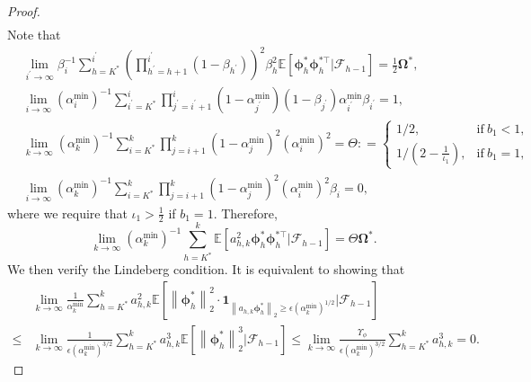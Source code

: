 \documentclass[aos]{imsart}
\numberwithin{equation}{section}
\theoremstyle{plain}
\begin{document}
\begin{appendix}
\begin{proof}
\begin{equation*}
\begin{split}
        \end{split}
    \end{equation*}
    Note that 
    \begin{equation}
        \begin{split}
            & \lim_{i^{\prime} \to \infty} \beta_{i}^{-1} \sum_{h=K^{*}}^{i^{\prime}} \left( \prod_{h^{\prime}=h+1}^{i^{\prime}} (1-\beta_{h^{\prime}}) \right)^2 \beta_h^2 \mathbb{E}\left[\bm{\phi}^{*}_{h}\bm{\phi}^{*\top}_{h}| \mathcal{F}_{h-1} \right] = \frac{1}{2} \bm{\Omega}^{*},\\
            & \lim_{i \to \infty}  (\alpha^{\min}_{i})^{-1} \sum_{i^{\prime}=K^{*}}^{i} \prod_{j^{\prime}=i^{\prime}+1}^{i} \left(1-\alpha^{\min}_{j^{\prime}} \right) \left(1-\beta_{j^{\prime}} \right) \alpha^{\min}_{i^{\prime}} \beta_{i^{\prime}} =  1,\\
            &  \lim_{k \to \infty}  (\alpha^{\min}_{k})^{-1} \sum_{i=K^{*}}^{k} \prod_{j=i+1}^{k} \left(1-\alpha^{\min}_j \right)^2 (\alpha^{\min}_i)^2 = \Theta : = \left\{ \begin{array}{cc}
               1/2,  & \text{if}~b_1 < 1, \\
               1/\left(2 - \frac{1}{\iota_1}\right),  & \text{if}~b_1 = 1,
            \end{array} \right.\\
            & \lim_{i \to \infty}  (\alpha^{\min}_{k})^{-1}  \sum_{i=K^{*}}^{k} \prod_{j=i+1}^{k} (1-\alpha^{\min}_j)^2 (\alpha^{\min}_i)^2 \beta_{i} = 0,
        \end{split}
    \end{equation}
    where we require that $\iota_1 > \frac{1}{2}$ if $b_1 = 1$.
    Therefore, 
    \begin{equation*}
        \lim_{k \to \infty} (\alpha^{\min}_{k})^{-1}   \sum_{h=K^{*}}^{k} \mathbb{E} \left[ a_{h,k}^2  \bm{\phi}^{*}_{h}\bm{\phi}^{*\top}_{h} | \mathcal{F}_{h-1}\right] = \Theta \bm{\Omega}^{*}.
    \end{equation*}
    We then verify the Lindeberg condition. It is equivalent to showing that 
    \begin{equation}
        \begin{split}
            & \lim_{k \to \infty} \frac{1}{\alpha^{\min}_k } \sum_{h=K^{*}}^{k} a_{h,k}^2 \mathbb{E}\left[ \left\| \bm{\phi}_{h}^{*}\right\|_2^2 \cdot \bm{1}_{\left\|a_{h,k} \bm{\phi}_{h}^{*} \right\|_2 \geq \epsilon  (\alpha^{\min}_k)^{1/2} } | \mathcal{F}_{h-1}\right] \\
            \leq & \lim_{k \to \infty} \frac{1}{\epsilon (\alpha^{\min}_k)^{3/2}} \sum_{h=K^{*}}^{k} a_{h,k}^3 \mathbb{E}\left[ \left\| \bm{\phi}_{h}^{*}\right\|_2^3 | \mathcal{F}_{h-1} \right] \leq \lim_{k \to \infty} \frac{\Upsilon_{\phi}}{\epsilon (\alpha^{\min}_k)^{3/2}} \sum_{h=K^{*}}^{k} a_{h,k}^3 = 0.

\end{split}
\end{equation}
\end{proof}
\end{appendix}
\end{document}
